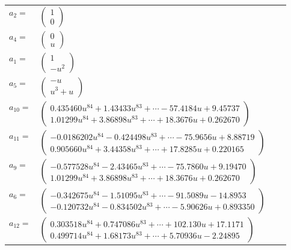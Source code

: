 \documentclass[1p]{elsarticle_modified}
\theoremstyle{definition}
\begin{document}
\begin{tabular}{m{7pt} m{180pt} m{7pt} m{180pt} }
\flushright $a_{2}=$&$\begin{pmatrix}1\\0\end{pmatrix}$ \\
\flushright $a_{4}=$&$\begin{pmatrix}0\\u\end{pmatrix}$ \\
\flushright $a_{1}=$&$\begin{pmatrix}1\\- u^2\end{pmatrix}$ \\
\flushright $a_{5}=$&$\begin{pmatrix}- u\\u^3+u\end{pmatrix}$ \\
\flushright $a_{10}=$&$\begin{pmatrix}0.435460 u^{84}+1.43433 u^{83}+\cdots-57.4184 u+9.45737\\1.01299 u^{84}+3.86898 u^{83}+\cdots+18.3676 u+0.262670\end{pmatrix}$ \\
\flushright $a_{11}=$&$\begin{pmatrix}-0.0186202 u^{84}-0.424498 u^{83}+\cdots-75.9656 u+8.88719\\0.905660 u^{84}+3.44358 u^{83}+\cdots+17.8285 u+0.220165\end{pmatrix}$ \\
\flushright $a_{9}=$&$\begin{pmatrix}-0.577528 u^{84}-2.43465 u^{83}+\cdots-75.7860 u+9.19470\\1.01299 u^{84}+3.86898 u^{83}+\cdots+18.3676 u+0.262670\end{pmatrix}$ \\
\flushright $a_{6}=$&$\begin{pmatrix}-0.342675 u^{84}-1.51095 u^{83}+\cdots-91.5089 u-14.8953\\-0.120732 u^{84}-0.834502 u^{83}+\cdots-5.90626 u+0.893350\end{pmatrix}$ \\
\flushright $a_{12}=$&$\begin{pmatrix}0.303518 u^{84}+0.747086 u^{83}+\cdots+102.130 u+17.1171\\0.499714 u^{84}+1.68173 u^{83}+\cdots+5.70936 u-2.24895\end{pmatrix}$ \\

\end{tabular}
\end{document}
